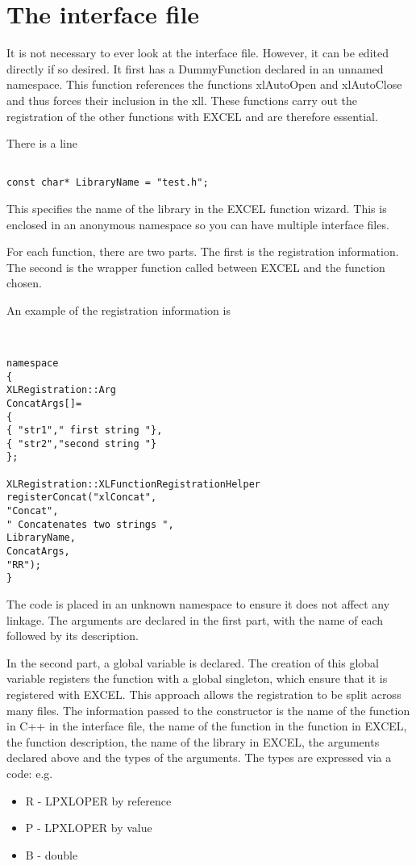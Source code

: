 \documentclass[12pt,reqno]{amsart}
\numberwithin{equation}{section}
\numberwithin{figure}{section}
\begin{document}
\section{The interface file}

It is not necessary to ever look at the interface file. However, it
can be edited directly if so desired. It first has a DummyFunction
declared in an unnamed namespace. This function references the
functions xlAutoOpen and xlAutoClose and thus forces their inclusion
in the xll. These functions carry out the registration of the other
functions with EXCEL and are therefore essential. 

There is a line
\begin{verbatim}

const char* LibraryName = "test.h";

\end{verbatim}
This specifies the name of the library in the EXCEL function
wizard. This is enclosed in an anonymous namespace so you can have
multiple interface files. 

For each function, there are two parts. The first is the registration
information. The second is the wrapper function called between EXCEL
and the function chosen. 

An example of the registration information is 
\begin{verbatim}


namespace
{
XLRegistration::Arg
ConcatArgs[]=
{
{ "str1"," first string "},
{ "str2","second string "}
};
  
XLRegistration::XLFunctionRegistrationHelper
registerConcat("xlConcat",
"Concat",
" Concatenates two strings ",
LibraryName,
ConcatArgs,
"RR");
}

\end{verbatim}

The code is placed in an unknown namespace to ensure it does not
affect any linkage. The arguments are declared in the first part, with
the name of each followed by its description. 

In the second part, a global variable is declared. The creation of
this global variable registers the function with a global singleton,
which ensure that it is registered with EXCEL. This approach allows
the registration to be split across many files. The information passed
to the constructor is the name of the function in C++ in the interface
file, the name of the function in the function in EXCEL, the function
description, the name of the library in EXCEL, the arguments declared
above and the types of the arguments. The types are expressed via a
code: e.g. 
\begin{itemize}
\item R - LPXLOPER by reference
\item P - LPXLOPER by value
\item B - double
\end{itemize}
\end{document}
